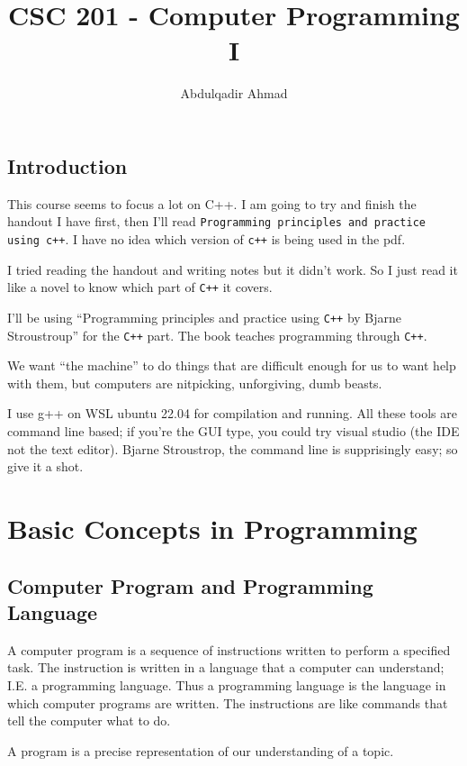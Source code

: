 \documentclass{book}
\title{CSC 201 {-} Computer Programming I}
\author{Abdulqadir Ahmad}
\begin{document}
\maketitle
\tableofcontents

\section{Introduction}
This course seems to focus a lot on C++. I am going to try and finish the handout I have first, then I'll read \verb|Programming principles and practice using c++|. I have no idea which version of \verb|c++| is being used in the pdf.

I tried reading the handout and writing notes but it didn't work. So I just read it like a novel to know which part of \verb|C++| it covers.

I'll be using ``Programming principles and practice using \verb|C++| by Bjarne Stroustroup'' for the \verb|C++| part. The book teaches programming through \verb|C++|.

\begin{itshape}
	 We want “the machine” to do things that are difficult enough for us to want help with them, but computers are nitpicking, unforgiving, dumb beasts.
\end{itshape}

I use g++ on WSL ubuntu 22.04 for compilation and running. All these tools are command line based; if you're the GUI type, you could try visual studio (the IDE not the text editor). Bjarne Stroustrop, the command line is supprisingly easy; so give it a shot.

\chapter{Basic Concepts in Programming}

\section{Computer Program and Programming Language}
A computer program is a sequence of instructions written to perform a specified task. The instruction is written in a language that a computer can understand; I.E. a programming language. Thus a programming language is the language in which computer programs are written. The instructions are like commands that tell the computer what to do.

A program is a precise representation of our understanding of a topic.
\end{document}

